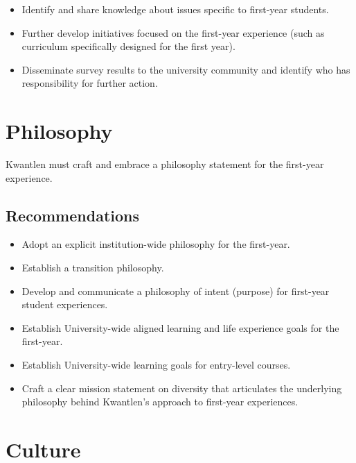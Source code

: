 \documentclass[10pt, letterpaper]{article}
\begin{document}
\begin{itemize}
\item
  Identify and share knowledge about issues specific to first-year
  students.
\end{itemize}

\begin{itemize}
\item
  Further develop initiatives focused on the first-year experience (such
  as curriculum specifically designed for the first year).
\end{itemize}

\begin{itemize}
\item
  Disseminate survey results to the university community and identify
  who has responsibility for further action.
\end{itemize}

\section{Philosophy}

Kwantlen must craft and embrace a philosophy statement for the
first-year experience.

\subsection{Recommendations}

\begin{itemize}
\item
  Adopt an explicit institution-wide philosophy for the first-year.
\item
  Establish a transition philosophy.
\item
  Develop and communicate a philosophy of intent (purpose) for
  first-year student experiences.
\end{itemize}

\begin{itemize}
\item
  Establish University-wide aligned learning and life experience goals
  for the first-year.
\item
  Establish University-wide learning goals for entry-level courses.
\item
  Craft a clear mission statement on diversity that articulates the
  underlying philosophy behind Kwantlen's approach to first-year
  experiences.
\end{itemize}

\section{Culture}
\end{document}
